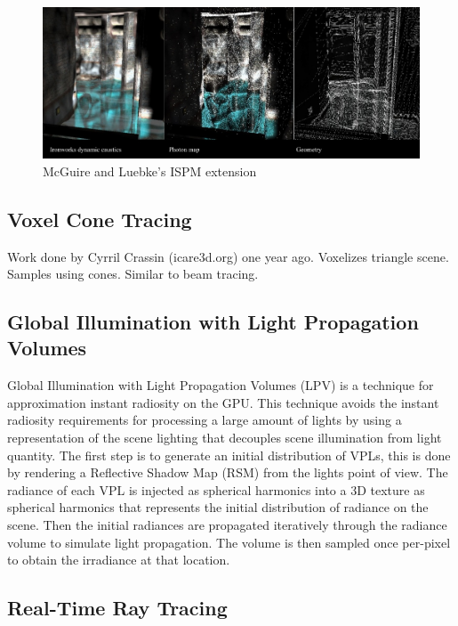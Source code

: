 		\begin{figure}
			\centering
				\includegraphics[width=1.00\textwidth]{Media/ispm.jpg}
			\caption{McGuire and Luebke's ISPM extension}
			\label{fig:ispm}
		\end{figure}
	
	\subsection {Voxel Cone Tracing}
		Work done by Cyrril Crassin (icare3d.org) one year ago. Voxelizes triangle scene. Samples using cones. Similar to beam tracing. \cite{crassin2011}

	\subsection {Global Illumination with Light Propagation Volumes}

	Global Illumination with Light Propagation Volumes (LPV) is a technique for approximation instant radiosity on the GPU. \cite{kaplanyan2009} This technique avoids the instant radiosity requirements for processing a large amount of lights by using a representation of the scene lighting that decouples scene illumination from light quantity. The first step is to generate an initial distribution of VPLs, this is done by rendering a Reflective Shadow Map (RSM) \cite{dachsbacher2005} from the lights point of view. The radiance of each VPL is injected as spherical harmonics into a 3D texture as spherical harmonics that represents the initial distribution of radiance on the scene. Then the initial radiances are propagated iteratively through the radiance volume to simulate light propagation. The volume is then sampled once per-pixel to obtain the irradiance at that location.

\subsection {Real-Time Ray Tracing}
